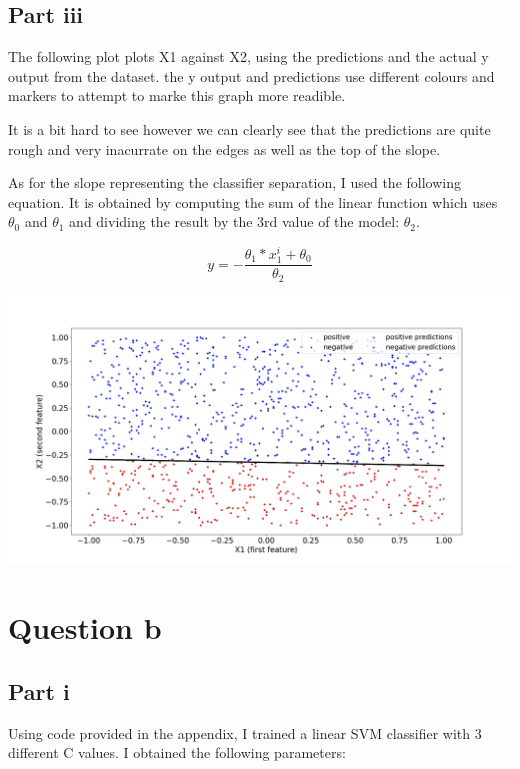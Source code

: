 \documentclass[10pt]{article}
\begin{document}
\subsection*{Part iii}
The following plot plots X1 against X2, using the predictions and
the actual y output from the dataset.
the y output and predictions use different colours and markers to attempt to marke
this graph more readible.



It is a bit hard to see however we can clearly see that the predictions
are quite rough and very inacurrate on the edges as well as the top of the
slope.

As for the slope representing the classifier separation, I used the
following equation. It is obtained by computing the sum of the linear function
which uses $\theta_{0}$ and $\theta_{1}$ and dividing the result
by the 3rd value of the model: $\theta_{2}$.

\begin{equation*}
    y = -\frac{\theta_{1} * x_{1}^{i} + \theta_{0}}{\theta_{2}}
\end{equation*}

\vspace{5mm} %

\includegraphics[scale=0.245]{Figure_2.png}

\section*{Question b}
\subsection*{Part i}
Using code provided in the appendix, I trained a linear SVM
classifier with 3 different C values. I obtained the following parameters:
\end{document}
